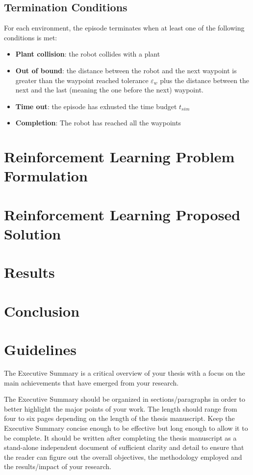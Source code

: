 \documentclass[11pt,a4paper,twocolumn]{article}
\begin{document}
\subsection{Termination Conditions}
For each environment, the episode terminates when at least one of the following conditions is met:
\begin{itemize}
    \item \textbf{Plant collision}: the robot collides with a plant
    \item \textbf{Out of bound}: the distance between the robot and the next waypoint is greater than the waypoint reached tolerance $\varepsilon_w$ plus the distance between the next and the last (meaning the one before the next) waypoint.
    \item \textbf{Time out}: the episode has exhusted the time budget $t_{sim}$
    \item \textbf{Completion}: The robot has reached all the waypoints
\end{itemize}


\section{Reinforcement Learning Problem Formulation}

\section{Reinforcement Learning Proposed Solution}


\section{Results}

\section{Conclusion}

\section{Guidelines}
\label{sec:guidelines}

The Executive Summary is a critical overview of your thesis
with a focus on the main achievements that have emerged from your research.

The Executive Summary should be organized in sections/paragraphs
in order to better highlight the major points of your work.
The length should range from four to six pages depending on the length of the thesis manuscript.
Keep the Executive Summary concise enough to be effective but long enough to allow it to be complete.
It should be written after completing the thesis manuscript as a stand-alone independent document
of sufficient clarity and detail to ensure that the reader can figure out the overall objectives,
the methodology employed and the results/impact of your research.
\end{document}
